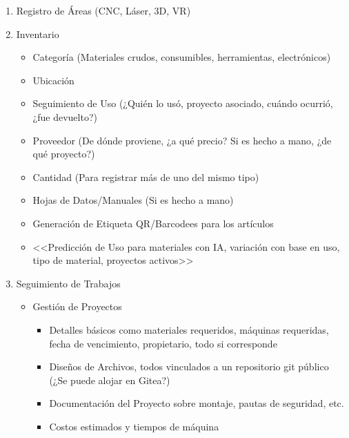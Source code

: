 \documentclass{article}
\begin{document}
\begin{enumerate}
\begin{enumerate}
\begin{itemize}
                \end{itemize}
          \item Registro de Áreas (CNC, Láser, 3D, VR)
          \item Inventario
                \begin{itemize}
                  \item Categoría (Materiales crudos, consumibles, herramientas, electrónicos)
                  \item Ubicación
                  \item Seguimiento de Uso (¿Quién lo usó, proyecto asociado, cuándo ocurrió, ¿fue devuelto?)
                  \item Proveedor (De dónde proviene, ¿a qué precio? Si es hecho a mano, ¿de qué proyecto?)
                  \item Cantidad (Para registrar más de uno del mismo tipo)
                  \item Hojas de Datos/Manuales (Si es hecho a mano)
                  \item Generación de Etiqueta QR/Barcodees para los artículos
                  \item <<Predicción de Uso para materiales con IA, variación con base en uso, tipo de material, proyectos activos>>
                \end{itemize}
          \item Seguimiento de Trabajos
                \begin{itemize}
                  \item Gestión de Proyectos
                        \begin{itemize}
                          \item Detalles básicos como materiales requeridos, máquinas requeridas, fecha de vencimiento, propietario, todo si corresponde
                          \item Diseños de Archivos, todos vinculados a un repositorio git público (¿Se puede alojar en Gitea?)
                          \item Documentación del Proyecto sobre montaje, pautas de seguridad, etc.
                          \item Costos estimados y tiempos de máquina

\end{itemize}
\end{itemize}
\end{enumerate}
\end{enumerate}
\end{document}
